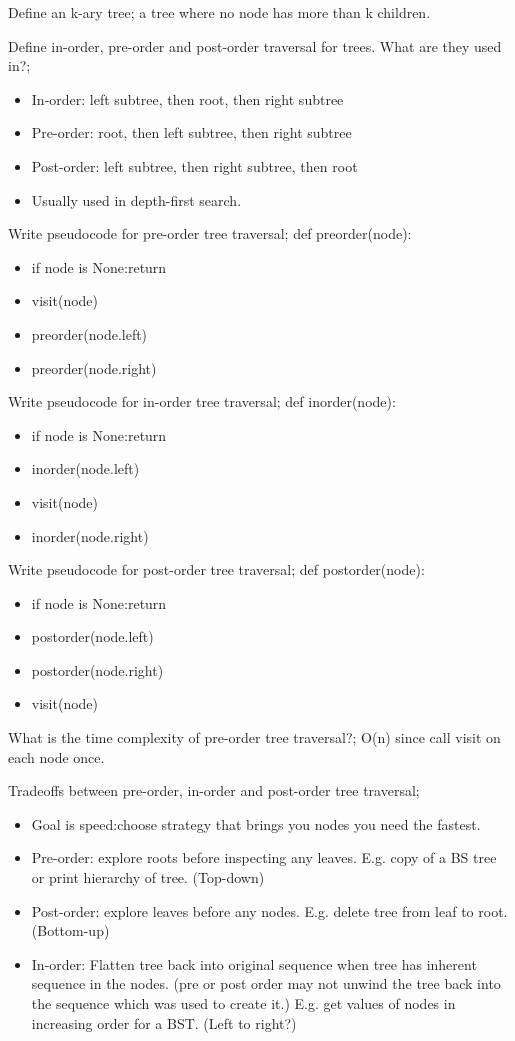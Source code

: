 \documentclass{article}
\begin{document}
Define an k-ary tree; a tree where no node has more than k children.

Define in-order, pre-order and post-order traversal for trees. What are they used in?; \begin{itemize} \item In-order: left subtree, then root, then right subtree \item Pre-order: root, then left subtree, then right subtree \item Post-order: left subtree, then right subtree, then root \item Usually used in depth-first search. \end{itemize}

Write pseudocode for pre-order tree traversal; def preorder(node): \begin{itemize} \item if node is None:return \item visit(node) \item preorder(node.left) \item preorder(node.right) \end{itemize}

Write pseudocode for in-order tree traversal; def inorder(node): \begin{itemize} \item if node is None:return \item inorder(node.left) \item visit(node) \item inorder(node.right) \end{itemize}

Write pseudocode for post-order tree traversal; def postorder(node): \begin{itemize} \item if node is None:return \item postorder(node.left) \item postorder(node.right) \item visit(node) \end{itemize}

What is the time complexity of pre-order tree traversal?; O(n) since call visit on each node once.

Tradeoffs between pre-order, in-order and post-order tree traversal; \begin{itemize} \item Goal is speed:choose strategy that brings you nodes you need the fastest.  \item Pre-order: explore roots before inspecting any leaves. E.g. copy of a BS tree or print hierarchy of tree. (Top-down) \item Post-order: explore leaves before any nodes. E.g. delete tree from leaf to root. (Bottom-up) \item In-order: Flatten tree back into original sequence when tree has inherent sequence in the nodes. (pre or post order may not unwind the tree back into the sequence which was used to create it.)	E.g. get values of nodes in increasing order for a BST. (Left to right?) \end{itemize} 
\end{document}
